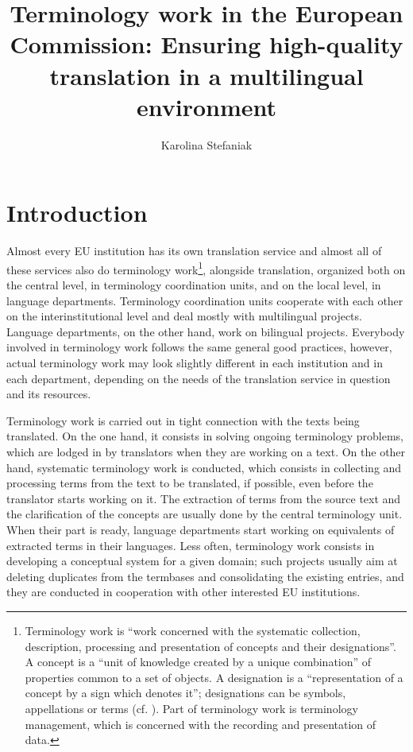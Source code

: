 \documentclass[output=paper]{langsci/langscibook}
\author{Karolina Stefaniak\affiliation{Directorate-General for Translation, European Commission}}
\title{Terminology work in the European Commission: Ensuring high-quality translation in a multilingual environment}
\begin{document}
\section{Introduction}\label{sec:stefaniak:1} 
  

Almost every EU institution has its own translation service and almost all of these services also do terminology work\footnote{Terminology work is “work concerned with the systematic collection, description, processing and presentation of concepts and their designations”. A concept is a “unit of knowledge created by a unique combination” of properties common to a set of objects. A designation is a “representation of a concept by a sign which denotes it”; designations can be symbols, appellations or terms (cf. \citeauthor{ISO2000}). Part of terminology work is terminology management, which is concerned with the recording and presentation of data.}, alongside translation, organized both on the central level, in terminology coordination units, and on the local level, in language departments. Terminology coordination units cooperate with each other on the interinstitutional level and deal mostly with multilingual projects. Language departments, on the other hand, work on bilingual projects. Everybody involved in terminology work follows the same general good practices, however, actual terminology work may look slightly different in each institution and in each department, depending on the needs of the translation service in question and its resources.

Terminology work is carried out in tight connection with the texts being translated. On the one hand, it consists in solving ongoing terminology problems, which are lodged in by translators when they are working on a text. On the other hand, systematic terminology work is conducted, which consists in collecting and processing terms from the text to be translated, if possible, even before the translator starts working on it. The extraction of terms from the source text and the clarification of the concepts are usually done by the central terminology unit. When their part is ready, language departments start working on equivalents of extracted terms in their languages. Less often, terminology work consists in developing a conceptual system for a given domain; such projects usually aim at deleting duplicates from the termbases and consolidating the existing entries, and they are conducted in cooperation with other interested EU institutions.
\end{document}
